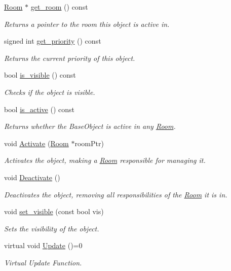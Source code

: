 \begin{DoxyCompactItemize}
\item 
\hyperlink{class_helios_1_1_room}{Room} $\ast$ \hyperlink{class_helios_1_1_base_obj_a896030076cb96c794f4b202cca0ec584}{get\+\_\+room} () const 
\begin{DoxyCompactList}\small\item\em Returns a pointer to the room this object is active in. \end{DoxyCompactList}\item 
signed int \hyperlink{class_helios_1_1_base_obj_abf2a6d187e1c8329bb8e24256218aecb}{get\+\_\+priority} () const 
\begin{DoxyCompactList}\small\item\em Returns the current priority of this object. \end{DoxyCompactList}\item 
bool \hyperlink{class_helios_1_1_base_obj_a418fb8f5e8aa25f0969e37e24cadb8c9}{is\+\_\+visible} () const 
\begin{DoxyCompactList}\small\item\em Checks if the object is visible. \end{DoxyCompactList}\item 
bool \hyperlink{class_helios_1_1_base_obj_a8c748b30dca39c303e8bb9085f9d6d15}{is\+\_\+active} () const 
\begin{DoxyCompactList}\small\item\em Returns whether the Base\+Object is active in any \hyperlink{class_helios_1_1_room}{Room}. \end{DoxyCompactList}\item 
void \hyperlink{class_helios_1_1_base_obj_a0d168130905c7e573ef0a69b53b73bed}{Activate} (\hyperlink{class_helios_1_1_room}{Room} $\ast$room\+Ptr)
\begin{DoxyCompactList}\small\item\em Activates the object, making a \hyperlink{class_helios_1_1_room}{Room} responsible for managing it. \end{DoxyCompactList}\item 
void \hyperlink{class_helios_1_1_base_obj_ade0a810a861f41a43adf0e7c766951d1}{Deactivate} ()
\begin{DoxyCompactList}\small\item\em Deactivates the object, removing all responsibilities of the \hyperlink{class_helios_1_1_room}{Room} it is in. \end{DoxyCompactList}\item 
void \hyperlink{class_helios_1_1_base_obj_a354767a20905778fefe96fe895a382ae}{set\+\_\+visible} (const bool vis)
\begin{DoxyCompactList}\small\item\em Sets the visibility of the object. \end{DoxyCompactList}\item 
virtual void \hyperlink{class_helios_1_1_base_obj_aa42e26e872234b6871d159c29afdef17}{Update} ()=0
\begin{DoxyCompactList}\small\item\em Virtual Update Function. \end{DoxyCompactList}\end{DoxyCompactItemize}
